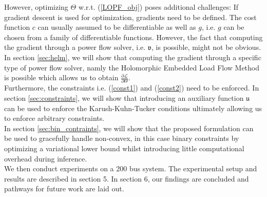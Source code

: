 However, optimizing $\Theta$ w.r.t. (\ref{LOPF_obj}) poses additional challenges: If gradient descent is used for optimization, gradients need to be defined. The cost function $c$ can usually assumed to be differentiable as well as $g$, i.e. $g$ can be chosen from a family of differentiable functions. However, the fact that computing the gradient through a power flow solver, i.e. $\mathfrak{v}$, is possible, might not be obvious. In section \ref{sec:helm}, we will show that computing the gradient through a specific type of power flow solver, namly the Holomorphic Embedded Load Flow Method is possible which allows us to obtain $\frac{\partial \mathcal{L}}{\partial \Theta}$.\\
Furthermore, the constraints i.e. (\ref{const1}) and (\ref{const2}) need to be enforced. In section \ref{sec:constraints}, we will show that introducing an auxiliary function $\mathfrak{u}$ can be used to enforce the Karush-Kuhn-Tucker conditions ultimately allowing us to enforce arbitrary constraints.\\
In section \ref{sec:bin_contraints}, we will show that the proposed formulation can be used to gracefully handle non-convex, in this case binary constraints by optimizing a variational lower bound whilst introducing little computational overhead during inference.\\
We then conduct experiments on a 200 bus system. The experimental setup and results are described in section 5. In section 6, our findings are concluded and pathways for future work are laid out.


